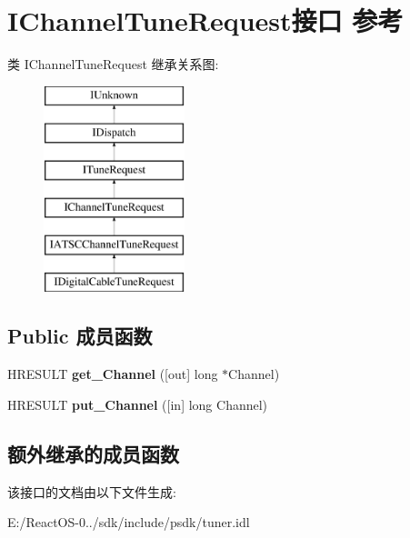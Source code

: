 \hypertarget{interface_i_channel_tune_request}{}\section{I\+Channel\+Tune\+Request接口 参考}
\label{interface_i_channel_tune_request}
类 I\+Channel\+Tune\+Request 继承关系图\+:\begin{figure}[H]
\begin{center}
\leavevmode
\includegraphics[height=6.000000cm]{interface_i_channel_tune_request}
\end{center}
\end{figure}
\subsection*{Public 成员函数}
\begin{DoxyCompactItemize}
\item 
\mbox{\label{interface_i_channel_tune_request_a09b9244db58cdd75f33e40d6ca60ce0a}} 
H\+R\+E\+S\+U\+LT {\bfseries get\+\_\+\+Channel} (\mbox{[}out\mbox{]} long $\ast$Channel)
\item 
\mbox{\label{interface_i_channel_tune_request_a8bba9ce00d293c85f4205fd0a616111e}} 
H\+R\+E\+S\+U\+LT {\bfseries put\+\_\+\+Channel} (\mbox{[}in\mbox{]} long Channel)
\end{DoxyCompactItemize}
\subsection*{额外继承的成员函数}


该接口的文档由以下文件生成\+:\begin{DoxyCompactItemize}
\item 
E\+:/\+React\+O\+S-\/0../sdk/include/psdk/tuner.\+idl\end{DoxyCompactItemize}
